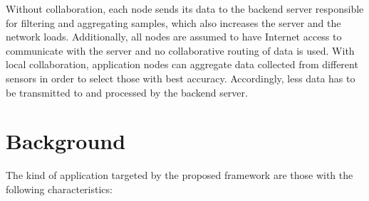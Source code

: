 Without collaboration, each node sends its data to the backend server responsible for filtering and aggregating samples, which also increases the server and the network loads. Additionally, all nodes are assumed to have Internet access to communicate with the server and no collaborative routing of data is used. With local collaboration, application nodes can aggregate data collected from different sensors in order to select those with best accuracy. Accordingly, less data has to be transmitted to and processed by the backend server.

\section{Background}

The kind of application targeted by the proposed framework are those with the following characteristics:

